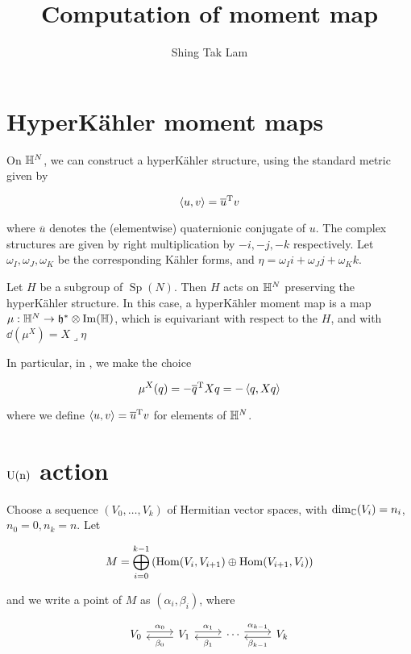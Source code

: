 \documentclass{article}
\title{Computation of moment map}
\author{Shing Tak Lam}
\DeclareMathOperator{\Sp}{Sp}
\begin{document}
\maketitle

\section{HyperK\"ahler moment maps}

On \(\mathbb{H}^N\), we can construct a hyperK\"ahler structure, using the standard metric given by

\[\left\langle u, v \right\rangle = \overline u^{\mathrm{T}} v\]

where \(\overline u\) denotes the (elementwise) quaternionic conjugate of \(u\). The complex structures are given by right multiplication by \(-i, -j, -k\) respectively. Let \(\omega_I, \omega_J, \omega_K\) be the corresponding K\"ahler forms, and \(\eta = \omega_I i + \omega_J j + \omega_K k\).

Let \(H\) be a subgroup of \(\Sp(N)\). Then \(H\) acts on \(\mathbb{H}^N\) preserving the hyperK\"ahler structure. In this case, a hyperK\"ahler moment map is a map \(\mu : \mathbb{H}^N \to \mathfrak{h}^* \otimes \Im(\mathbb{H})\), which is equivariant with respect to the \(H\), and with \(\dd(\mu^X) = X \lrcorner \eta\)

In particular, in \cite{kobak_classical_1996}, we make the choice

\[\mu^X(q) = -\overline q^{\mathrm{T}} X q = -\left\langle q, Xq \right\rangle\]

where we define \(\left\langle u, v \right\rangle = \overline u^{\mathrm{T}} v\) for elements of \(\mathbb{H}^N\).

\section{\(\rm U(n)\) action}

Choose a sequence \((V_0, \dots, V_k)\) of Hermitian vector spaces, with \(\dim_{\mathbb{C}}(V_i) = n_i\), \(n_0 = 0, n_k = n\). Let

\[M = \bigoplus_{i=0}^{k-1}\left(\operatorname{Hom}(V_i, V_{i+1}) \oplus \operatorname{Hom}(V_{i+1}, V_i)\right)\]

and we write a point of \(M\) as \((\alpha_i, \beta_i)\), where

\[\begin{tikzcd}[ampersand replacement=\&]
	{V_0} \& {V_1} \& \cdots \& {V_k}
	\arrow["{\alpha_0}", shift left=1, from=1-1, to=1-2]
	\arrow["{\alpha_1}", shift left=1, from=1-2, to=1-3]
	\arrow["{\alpha_{k-1}}", shift left=1, from=1-3, to=1-4]
	\arrow["{\beta_{k-1}}", shift left=1, from=1-4, to=1-3]
	\arrow["{\beta_1}", shift left=1, from=1-3, to=1-2]
	\arrow["{\beta_0}", shift left=1, from=1-2, to=1-1]
\end{tikzcd}\]
\end{document}
